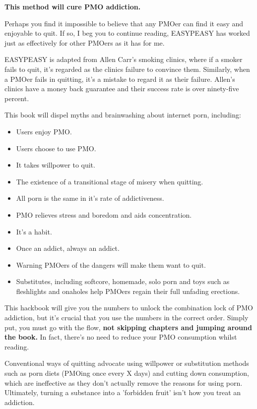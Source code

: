 \documentclass[easypeasy.tex]{subfiles}
\begin{document}
{\large\bfseries This method will cure PMO addiction.}

Perhaps you find it impossible to believe that any PMOer can find it easy and enjoyable to quit. If so, I beg you to continue reading, EASYPEASY has worked just as effectively for other PMOers as it has for me.

EASYPEASY is adapted from Allen Carr's smoking clinics, where if a smoker fails to quit, it's regarded as the clinics failure to convince them. Similarly, when a PMOer fails in quitting, it's a mistake to regard it as their failure. Allen's clinics have a money back guarantee and their success rate is over ninety-five percent.

This book will dispel myths and brainwashing about internet porn, including:
  \begin{itemize}
  \item Users enjoy PMO.
  \item Users choose to use PMO.
  \item It takes willpower to quit.
  \item The existence of a transitional stage of misery when quitting.
  \item All porn is the same in it's rate of addictiveness.
  \item PMO relieves stress and boredom and aids concentration.
  \item It's a habit.
  \item Once an addict, always an addict.
  \item Warning PMOers of the dangers will make them want to quit.
  \item Substitutes, including softcore, homemade, solo porn and toys such as fleshlights and onaholes help PMOers regain their full unfading erections.
\end{itemize}

This hackbook will give you the numbers to unlock the combination lock of PMO addiction, but it's crucial that you use the numbers in the correct order. Simply put, you must go with the flow, \textbf{not skipping chapters and jumping around the book.} In fact, there's no need to reduce your PMO consumption whilst reading.

Conventional ways of quitting advocate using willpower or substitution methods such as porn diets (PMOing once every X days) and cutting down consumption, which are ineffective as they don't actually remove the reasons for using porn. Ultimately, turning a substance into a 'forbidden fruit' isn't how you treat an addiction.
\end{document}
